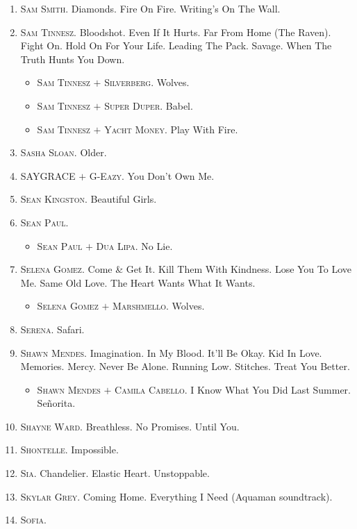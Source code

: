 \documentclass[oneside]{book}
\numberwithin{equation}{section}
\begin{document}
\begin{enumerate}
	\item \textsc{Sam Smith.} Diamonds. Fire On Fire. Writing's On The Wall.
	\item \textsc{Sam Tinnesz.} Bloodshot. Even If It Hurts. Far From Home (The Raven). Fight On. Hold On For Your Life. Leading The Pack. Savage. When The Truth Hunts You Down.
	\begin{itemize}
		\item \textsc{Sam Tinnesz $+$ Silverberg.} Wolves.
		\item \textsc{Sam Tinnesz $+$ Super Duper.} Babel.
		\item \textsc{Sam Tinnesz $+$ Yacht Money.} Play With Fire.
	\end{itemize}
	\item \textsc{Sasha Sloan.} Older.
	\item \textsc{SAYGRACE $+$ G-Eazy.} You Don't Own Me.
	\item \textsc{Sean Kingston.} Beautiful Girls.
	\item \textsc{Sean Paul.}
	\begin{itemize}
		\item \textsc{Sean Paul $+$ Dua Lipa.} No Lie.
	\end{itemize}
	\item \textsc{Selena Gomez.} Come \& Get It. Kill Them With Kindness. Lose You To Love Me. Same Old Love. The Heart Wants What It Wants.
	\begin{itemize}
		\item \textsc{Selena Gomez $+$ Marshmello.} Wolves.
	\end{itemize}
	\item \textsc{Serena.} Safari.
	\item \textsc{Shawn Mendes.} Imagination. In My Blood. It'll Be Okay. Kid In Love. Memories. Mercy. Never Be Alone. Running Low. Stitches. Treat You Better.
	\begin{itemize}
		\item \textsc{Shawn Mendes $+$ Camila Cabello.} I Know What You Did Last Summer. Se\~norita.
	\end{itemize}
	\item \textsc{Shayne Ward.} Breathless. No Promises. Until You.
	\item \textsc{Shontelle.} Impossible.
	\item \textsc{Sia.} Chandelier. Elastic Heart. Unstoppable.
	\item \textsc{Skylar Grey.} Coming Home. Everything I Need (Aquaman soundtrack).
	\item \textsc{Sofia.}

\end{enumerate}
\end{document}
